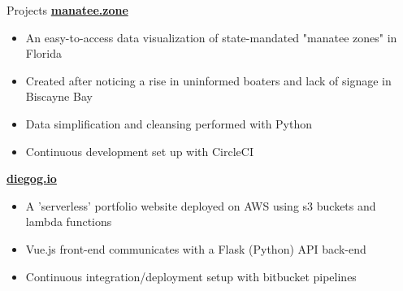 \documentclass{res} %
\begin{document}
\begin{rSection}{Projects}
{\bf \href{https://manatee.zone}{manatee.zone}}
\begin{itemize}[leftmargin=*, topsep=-3pt] \itemsep -5pt
  \item An easy-to-access data visualization of state-mandated "manatee zones" in Florida
  \item Created after noticing a rise in uninformed boaters and lack of signage in Biscayne Bay
  \item Data simplification and cleansing performed with Python
  \item Continuous development set up with CircleCI
\end{itemize}

{\bf \href{https://diegog.io}{diegog.io}}
\begin{itemize}[leftmargin=*, topsep=-3pt] \itemsep -5pt
  \item A 'serverless' portfolio website deployed on AWS using s3 buckets and lambda functions
  \item Vue.js front-end communicates with a Flask (Python) API back-end
  \item Continuous integration/deployment setup with bitbucket pipelines
\end{itemize}

\end{rSection}
\end{document}
